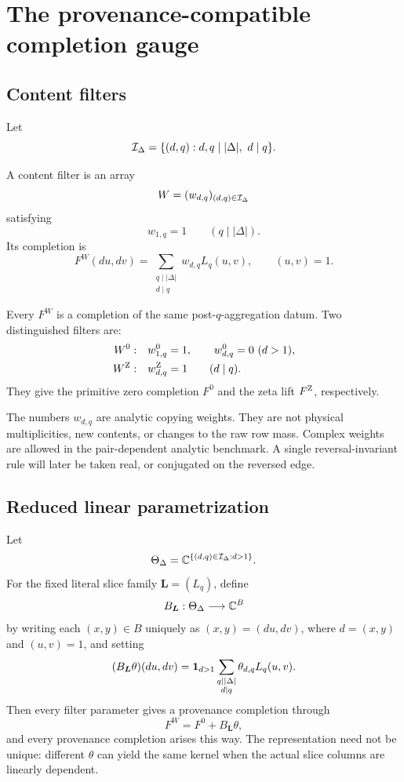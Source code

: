 \section{The provenance-compatible completion gauge}
\label{sec:provenance-gauge}

\subsection{Content filters}

Let
\[
 \mathcal I_\Delta
 =
 \{(d,q):d,q\mid|\Delta|,\ d\mid q\}.
\]

\begin{definition}
\label{def:provenance-filter}
A content filter is an array
\[
 W=(w_{d,q})_{(d,q)\in\mathcal I_\Delta}
\]
satisfying
\[
 w_{1,q}=1\qquad(q\mid|\Delta|).
\]
Its completion is
\begin{equation}
 F^W(du,dv)
 =
 \sum_{\substack{q\mid|\Delta|\\d\mid q}}
 w_{d,q}L_q(u,v),
 \qquad (u,v)=1.
 \label{eq:filtered-completion}
\end{equation}
\end{definition}

Every \(F^W\) is a completion of the same post-\(q\)-aggregation datum.
Two distinguished filters are:
\begin{align*}
 W^0:\quad&
 w^0_{1,q}=1,\qquad w^0_{d,q}=0\ (d>1),\\
 W^{\rm Z}:\quad&
 w^{\rm Z}_{d,q}=1\qquad(d\mid q).
\end{align*}
They give the primitive zero completion \(F^0\) and the zeta lift
\(F^{\rm Z}\), respectively.

\begin{remark}
The numbers \(w_{d,q}\) are analytic copying weights.  They are not
physical multiplicities, new contents, or changes to the raw row mass.
Complex weights are allowed in the pair-dependent analytic benchmark.
A single reversal-invariant rule will later be taken real, or conjugated
on the reversed edge.
\end{remark}

\subsection{Reduced linear parametrization}

Let
\[
 \Theta_\Delta
 =
 \mathbb C^{\{(d,q)\in\mathcal I_\Delta:d>1\}}.
\]
For the fixed literal slice family \(\boldsymbol L=(L_q)\), define
\[
 B_{\boldsymbol L}:\Theta_\Delta\longrightarrow\mathbb C^B
\]
by writing each \((x,y)\in B\) uniquely as
\((x,y)=(du,dv)\), where \(d=(x,y)\) and \((u,v)=1\), and setting
\begin{equation}
 (B_{\boldsymbol L}\theta)(du,dv)
 =
 \mathbf 1_{d>1}
 \sum_{\substack{q\mid|\Delta|\\d\mid q}}
 \theta_{d,q}L_q(u,v).
 \label{eq:content-flow-map}
\end{equation}
Then every filter parameter gives a provenance completion through
\[
 F^W=F^0+B_{\boldsymbol L}\theta,
\]
and every provenance completion arises this way.  The representation
need not be unique: different \(\theta\) can yield the same kernel when
the actual slice columns are linearly dependent.

